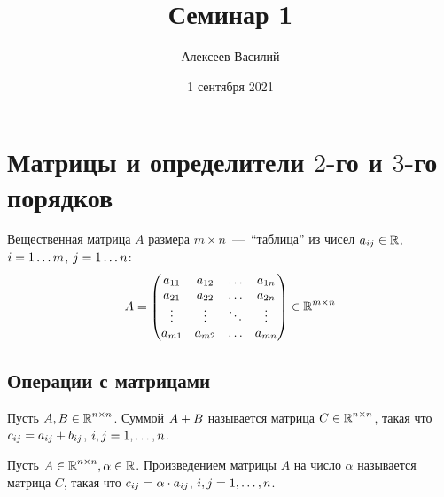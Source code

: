 \documentclass[a4paper,12pt]{article}
\author{Алексеев Василий}
\title{Семинар 1}
\date{1 сентября 2021}
\begin{document}
  \maketitle
  
  \tableofcontents

  \thispagestyle{empty}
  
  \newpage
  


  \section{Матрицы и определители $2$-го и $3$-го порядков}

  Вещественная матрица $A$ размера $m \times n$~---~``таблица'' из чисел $a_{ij} \hm\in \RR$, $i \hm= 1 \ldots m$, $j \hm= 1 \ldots n$:
  \[
    A = \begin{pmatrix}
      a_{11} & a_{12} & \ldots & a_{1n}\\
      a_{21} & a_{22} & \ldots & a_{2n}\\
      \vdots & \vdots & \ddots & \vdots\\
      a_{m1} & a_{m2} & \ldots & a_{mn}
    \end{pmatrix} \in \operatorname{\mathbb R}^{m \times n}
  \]
  
  
  \subsection{Операции с матрицами}
  
  \begin{definition}
    Пусть $A, B \in \operatorname{\mathbb R}^{n \times n}$.
    Суммой $A \hm+ B$ называется матрица $C \hm\in \RR^{n \times n}$, такая что
    $c_{ij} \hm= a_{ij} + b_{ij}$, $i, j \hm= 1, \ldots, n$.
  \end{definition}
  
  \begin{definition}
    Пусть $A \in \operatorname{\mathbb R}^{n \times n}, \alpha \in \operatorname{\mathbb R}$.
    Произведением матрицы $A$ на число $\alpha$ называется матрица $C$, такая что
    $c_{ij} \hm= \alpha \cdot a_{ij}$, $i, j \hm= 1, \ldots, n$.
  \end{definition}
  
\end{document}
